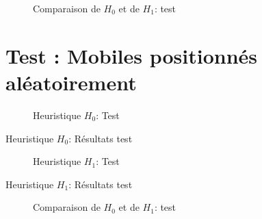   \begin{figure}[H]
    \centering
    \begin{tikzpicture}[yscale=0.5]
      
    \end{tikzpicture}
    \caption{Comparaison de $H_0$ et de $H_1$: test }
    \label{fig:comp_2}
  \end{figure}


\section{Test : Mobiles positionnés aléatoirement}

  \begin{figure}[H]
    \begin{center}
      \boxed{
      \begin{tikzpicture}[scale=0.5]
        
      \end{tikzpicture}}
    \end{center}
    \caption{Heuristique $H_0$: Test }
    \label{fig:H0_3}
  \end{figure}

  \begin{table}[H]
    \centering
    
    \caption{Heuristique $H_0$: Résultats test }
    \label{tab:H0_3}
  \end{table}

  \begin{figure}[H]
    \begin{center}
      \boxed{
      \begin{tikzpicture}[scale=0.5]
        
      \end{tikzpicture}}
    \end{center}
    \caption{Heuristique $H_1$: Test }
    \label{fig:H1_3}
  \end{figure}

  \begin{table}[H]
    \centering
    
    \caption{Heuristique $H_1$: Résultats test }
    \label{tab:H1_3}
  \end{table}

  \begin{figure}[H]
    \centering
    \begin{tikzpicture}[yscale=0.2]
      
    \end{tikzpicture}
    \caption{Comparaison de $H_0$ et de $H_1$: test }
    \label{fig:comp_3}
  \end{figure}

